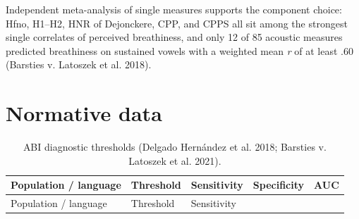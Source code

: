 \documentclass[
  english,
  letterpaper,
]{scrbook}
\begin{document}
Independent meta-analysis of single measures supports the component
choice: Hfno, H1--H2, HNR of Dejonckere, CPP, and CPPS all sit among the
strongest single correlates of perceived breathiness, and only 12 of 85
acoustic measures predicted breathiness on sustained vowels with a
weighted mean \emph{r} of at least .60 (Barsties v. Latoszek et al.
2018).

\section{Normative data}\label{normative-data-2}

\begin{longtable}[]{@{}
  >{\raggedright\arraybackslash}p{}
  >{\raggedright\arraybackslash}p{}
  >{\raggedright\arraybackslash}p{}
  >{\raggedright\arraybackslash}p{}
  >{\raggedright\arraybackslash}p{}@{}}
\caption{ABI diagnostic thresholds (Delgado Hernández et al. 2018;
Barsties v. Latoszek et al.
2021).}\label{tbl-abi-thresholds}\tabularnewline
\toprule\noalign{}
\begin{minipage}[b]{\linewidth}\raggedright
Population / language
\end{minipage} & \begin{minipage}[b]{\linewidth}\raggedright
Threshold
\end{minipage} & \begin{minipage}[b]{\linewidth}\raggedright
Sensitivity
\end{minipage} & \begin{minipage}[b]{\linewidth}\raggedright
Specificity
\end{minipage} & \begin{minipage}[b]{\linewidth}\raggedright
AUC
\end{minipage} \\
\midrule\noalign{}
\endfirsthead
\toprule\noalign{}
\begin{minipage}[b]{\linewidth}\raggedright
Population / language
\end{minipage} & \begin{minipage}[b]{\linewidth}\raggedright
Threshold
\end{minipage} & \begin{minipage}[b]{\linewidth}\raggedright
Sensitivity
\end{minipage} & \begin{minipage}[b]{\linewidth}\raggedright

\end{minipage}
\end{longtable}
\end{document}
